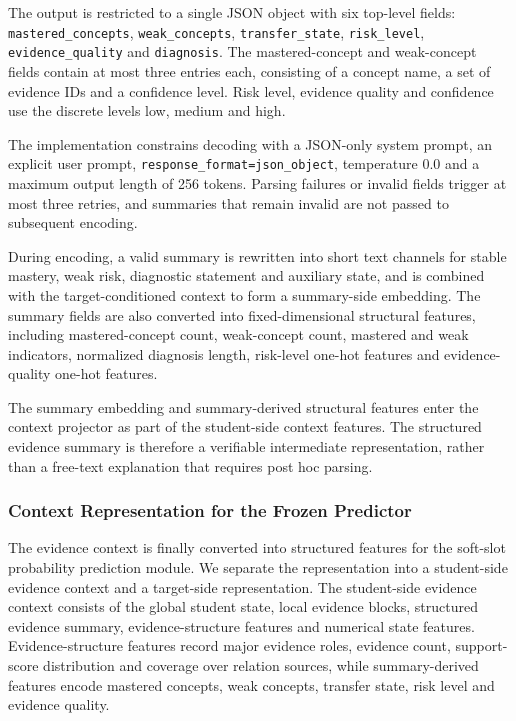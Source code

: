 \documentclass[a4paper,12pt]{article}
\numberwithin{table}{section}
\begin{document}
The output is restricted to a single JSON object with six top-level fields: \texttt{mastered\_concepts}, \texttt{weak\_concepts}, \texttt{transfer\_state}, \texttt{risk\_level}, \texttt{evidence\_quality} and \texttt{diagnosis}. The mastered-concept and weak-concept fields contain at most three entries each, consisting of a concept name, a set of evidence IDs and a confidence level. Risk level, evidence quality and confidence use the discrete levels low, medium and high.

The implementation constrains decoding with a JSON-only system prompt, an explicit user prompt, \texttt{response\_format=json\_object}, temperature 0.0 and a maximum output length of 256 tokens. Parsing failures or invalid fields trigger at most three retries, and summaries that remain invalid are not passed to subsequent encoding.

During encoding, a valid summary is rewritten into short text channels for stable mastery, weak risk, diagnostic statement and auxiliary state, and is combined with the target-conditioned context to form a summary-side embedding. The summary fields are also converted into fixed-dimensional structural features, including mastered-concept count, weak-concept count, mastered and weak indicators, normalized diagnosis length, risk-level one-hot features and evidence-quality one-hot features.

The summary embedding and summary-derived structural features enter the context projector as part of the student-side context features. The structured evidence summary is therefore a verifiable intermediate representation, rather than a free-text explanation that requires post hoc parsing.

\subsubsection{Context Representation for the Frozen Predictor}

The evidence context is finally converted into structured features for the soft-slot probability prediction module. We separate the representation into a student-side evidence context and a target-side representation. The student-side evidence context consists of the global student state, local evidence blocks, structured evidence summary, evidence-structure features and numerical state features. Evidence-structure features record major evidence roles, evidence count, support-score distribution and coverage over relation sources, while summary-derived features encode mastered concepts, weak concepts, transfer state, risk level and evidence quality.
\end{document}

